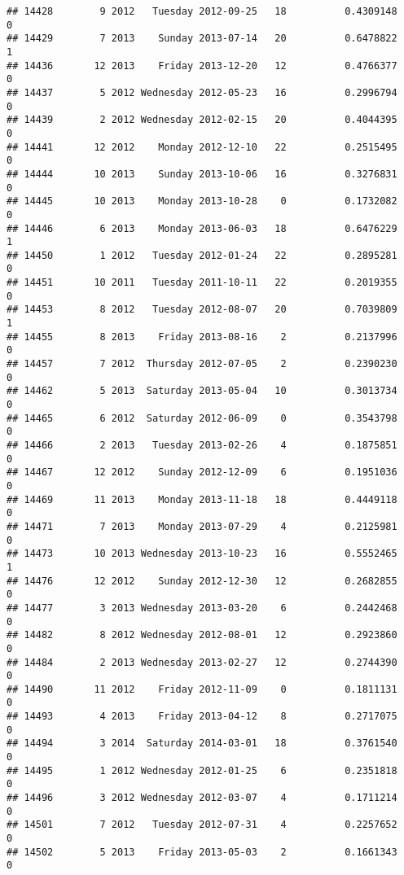 \documentclass[
]{article}
\begin{document}
\begin{verbatim}
## 14428        9 2012   Tuesday 2012-09-25   18          0.4309148             0
## 14429        7 2013    Sunday 2013-07-14   20          0.6478822             1
## 14436       12 2013    Friday 2013-12-20   12          0.4766377             0
## 14437        5 2012 Wednesday 2012-05-23   16          0.2996794             0
## 14439        2 2012 Wednesday 2012-02-15   20          0.4044395             0
## 14441       12 2012    Monday 2012-12-10   22          0.2515495             0
## 14444       10 2013    Sunday 2013-10-06   16          0.3276831             0
## 14445       10 2013    Monday 2013-10-28    0          0.1732082             0
## 14446        6 2013    Monday 2013-06-03   18          0.6476229             1
## 14450        1 2012   Tuesday 2012-01-24   22          0.2895281             0
## 14451       10 2011   Tuesday 2011-10-11   22          0.2019355             0
## 14453        8 2012   Tuesday 2012-08-07   20          0.7039809             1
## 14455        8 2013    Friday 2013-08-16    2          0.2137996             0
## 14457        7 2012  Thursday 2012-07-05    2          0.2390230             0
## 14462        5 2013  Saturday 2013-05-04   10          0.3013734             0
## 14465        6 2012  Saturday 2012-06-09    0          0.3543798             0
## 14466        2 2013   Tuesday 2013-02-26    4          0.1875851             0
## 14467       12 2012    Sunday 2012-12-09    6          0.1951036             0
## 14469       11 2013    Monday 2013-11-18   18          0.4449118             0
## 14471        7 2013    Monday 2013-07-29    4          0.2125981             0
## 14473       10 2013 Wednesday 2013-10-23   16          0.5552465             1
## 14476       12 2012    Sunday 2012-12-30   12          0.2682855             0
## 14477        3 2013 Wednesday 2013-03-20    6          0.2442468             0
## 14482        8 2012 Wednesday 2012-08-01   12          0.2923860             0
## 14484        2 2013 Wednesday 2013-02-27   12          0.2744390             0
## 14490       11 2012    Friday 2012-11-09    0          0.1811131             0
## 14493        4 2013    Friday 2013-04-12    8          0.2717075             0
## 14494        3 2014  Saturday 2014-03-01   18          0.3761540             0
## 14495        1 2012 Wednesday 2012-01-25    6          0.2351818             0
## 14496        3 2012 Wednesday 2012-03-07    4          0.1711214             0
## 14501        7 2012   Tuesday 2012-07-31    4          0.2257652             0
## 14502        5 2013    Friday 2013-05-03    2          0.1661343             0

\end{verbatim}
\end{document}
